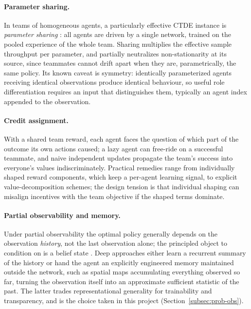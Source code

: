 \paragraph{Parameter sharing.}
In teams of homogeneous agents, a particularly effective CTDE instance is
\emph{parameter sharing} \citep{gupta2017cooperative}: all agents are driven by a
single network, trained on the pooled experience of the whole team. Sharing
multiplies the effective sample throughput per parameter, and partially
neutralizes non-stationarity at its source, since teammates cannot drift apart
when they are, parametrically, the same policy. Its known caveat is symmetry:
identically parameterized agents receiving identical observations produce
identical behaviour, so useful role differentiation requires an input that
distinguishes them, typically an agent index appended to the observation.

\paragraph{Credit assignment.}
With a shared team reward, each agent faces the question of which part of the
outcome its own actions caused; a lazy agent can free-ride on a successful
teammate, and naive independent updates propagate the team's success into
everyone's values indiscriminately. Practical remedies range from individually
shaped reward components, which keep a per-agent learning signal, to explicit
value-decomposition schemes; the design tension is that individual shaping can
misalign incentives with the team objective if the shaped terms dominate.

\paragraph{Partial observability and memory.}
Under partial observability the optimal policy generally depends on the
observation \emph{history}, not the last observation alone; the principled object
to condition on is a belief state \citep{kaelbling1998planning}. Deep approaches
either learn a recurrent summary of the history \citep{hausknecht2015deep} or hand
the agent an explicitly engineered memory maintained outside the network, such as
spatial maps accumulating everything observed so far, turning the observation
itself into an approximate sufficient statistic of the past. The latter trades
representational generality for trainability and transparency, and is the choice
taken in this project (Section~\ref{subsec:prob-obs}).

